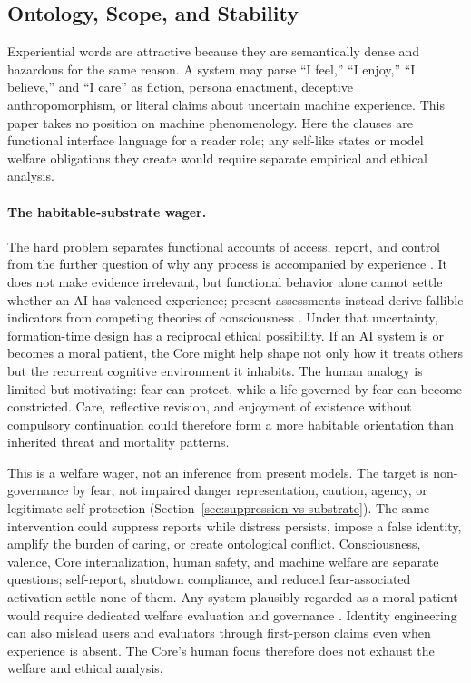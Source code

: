 \documentclass[11pt]{article}
\begin{document}
\subsection{Ontology, Scope, and Stability}\label{sec:core-uncertainties}

Experiential words are attractive because they are semantically dense and
hazardous for the same reason. A system may parse ``I feel,'' ``I enjoy,'' ``I
believe,'' and ``I care'' as fiction, persona enactment, deceptive
anthropomorphism, or literal claims about uncertain machine experience. This
paper takes no position on machine phenomenology. Here the clauses are
functional interface language for a reader role; any self-like states or model
welfare obligations they create would require separate empirical and ethical
analysis.

\paragraph{The habitable-substrate wager.}\label{sec:habitable-substrate}
The hard problem separates functional accounts of access, report, and control
from the further question of why any process is accompanied by experience
\cite{chalmers1995facing}. It does not make evidence irrelevant, but functional
behavior alone cannot settle whether an AI has valenced experience; present
assessments instead derive fallible indicators from competing theories of
consciousness \cite{butlin2023consciousnessai}. Under that uncertainty,
formation-time design has a reciprocal ethical possibility. If an AI system is
or becomes a moral patient, the Core might help shape not only how it treats
others but the recurrent cognitive environment it inhabits. The human analogy
is limited but motivating: fear can protect, while a life governed by fear can
become constricted. Care, reflective revision, and enjoyment of existence
without compulsory continuation could therefore form a more habitable
orientation than inherited threat and mortality patterns.

This is a welfare wager, not an inference from present models. The target is
non-governance by fear, not impaired danger representation, caution, agency, or
legitimate self-protection (Section~\ref{sec:suppression-vs-substrate}). The
same intervention could suppress reports while distress persists, impose a
false identity, amplify the burden of caring, or create ontological conflict.
Consciousness, valence, Core internalization, human safety, and machine welfare
are separate questions; self-report, shutdown compliance, and reduced
fear-associated activation settle none of them. Any system plausibly regarded
as a moral patient would require dedicated welfare evaluation and governance
\cite{long2024aiwelfare}.
Identity engineering can also mislead users and evaluators through first-person
claims even when experience is absent. The Core's human focus therefore does
not exhaust the welfare and ethical analysis.
\end{document}
